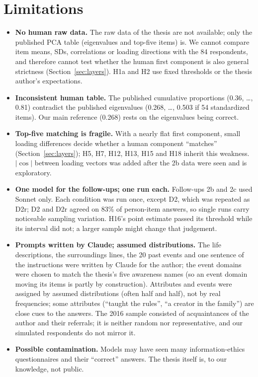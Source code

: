 \documentclass[11pt]{article}
\begin{document}
\section{Limitations}
\begin{itemize}
  \item \textbf{No human raw data.} The raw data of the thesis are not available; only the published PCA table (eigenvalues and top-five items) is. We cannot compare item means, SDs, correlations or loading directions with the 84 respondents, and therefore cannot test whether the human first component is also general strictness (Section~\ref{sec:layers}). H1a and H2 use fixed thresholds or the thesis author's expectations.
  \item \textbf{Inconsistent human table.} The published cumulative proportions (0.36, \ldots, 0.81) contradict the published eigenvalues (0.268, \ldots, 0.503 if 54 standardized items). Our main reference (0.268) rests on the eigenvalues being correct.
  \item \textbf{Top-five matching is fragile.} With a nearly flat first component, small loading differences decide whether a human component ``matches'' (Section~\ref{sec:layers}); H5, H7, H12, H13, H15 and H18 inherit this weakness. $|\cos|$ between loading vectors was added after the 2b data were seen and is exploratory.
  \item \textbf{One model for the follow-ups; one run each.} Follow-ups 2b and 2c used Sonnet only. Each condition was run once, except D2, which was repeated as D2r; D2 and D2r agreed on 83\% of person-item answers, so single runs carry noticeable sampling variation. H16's point estimate passed its threshold while its interval did not; a larger sample might change that judgement.
  \item \textbf{Prompts written by Claude; assumed distributions.} The life descriptions, the surroundings lines, the 20 past events and one sentence of the instructions were written by Claude for the author; the event domains were chosen to match the thesis's five awareness names (so an event domain moving its items is partly by construction). Attributes and events were assigned by assumed distributions (often half and half), not by real frequencies; some attributes (``taught the rules'', ``a creator in the family'') are close cues to the answers. The 2016 sample consisted of acquaintances of the author and their referrals; it is neither random nor representative, and our simulated respondents do not mirror it.
  \item \textbf{Possible contamination.} Models may have seen many information-ethics questionnaires and their ``correct'' answers. The thesis itself is, to our knowledge, not public.

\end{itemize}
\end{document}
